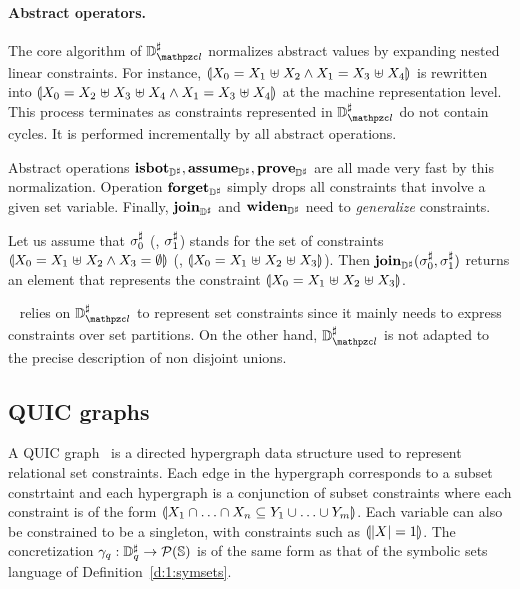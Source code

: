 \paragraph{Abstract operators.}
The core algorithm of \( \adomlin \) normalizes abstract values by
expanding nested linear constraints.
For instance, \( \llparenthesis X_0 = X_1 \mathrel{\uplus} X_2 \wedge
  X_1 = X_3 \mathrel{\uplus} X_4 \rrparenthesis \) is rewritten into
\( \llparenthesis X_0 = X_2 \mathrel{\uplus} X_3 \mathrel{\uplus} X_4 \wedge
  X_1 = X_3 \mathrel{\uplus} X_4 \rrparenthesis \) at the machine representation
level.
This process terminates as constraints represented in \( \adomlin \)
do not contain cycles.
It is performed incrementally by all abstract operations.

Abstract operations \( \textbf{isbot}_{{\mathbb{D}}^{\sharp}}, \textbf{assume}_{{\mathbb{D}}^{\sharp}}, \textbf{prove}_{{\mathbb{D}}^{\sharp}} \) are all
made very fast by this normalization.
Operation \( \textbf{forget}_{{\mathbb{D}}^{\sharp}} \) simply drops all constraints that involve
a given set variable.
Finally, \( \textbf{join}_{{\mathbb{D}}^{\sharp}} \) and \( \textbf{widen}_{{\mathbb{D}}^{\sharp}} \) need to {\em generalize}
constraints.
\begin{example}
  Let us assume that \( {\sigma}^{\sharp}_0 \) (\resp, \( {\sigma}^{\sharp}_1 \)) stands for
  the set of constraints \( \llparenthesis X_0 = X_1 \mathrel{\uplus} X_2
    \wedge X_3 = \emptyset \rrparenthesis \) (\resp, \( \llparenthesis X_0 = X_1
    \mathrel{\uplus} X_2 \mathrel{\uplus} X_3 \rrparenthesis \)).
  Then \( \textbf{join}_{{\mathbb{D}}^{\sharp}}( {\sigma}^{\sharp}_0, {\sigma}^{\sharp}_1 ) \) returns an element that
  represents the constraint \( \llparenthesis X_0 = X_1 \mathrel{\uplus} X_2
    \mathrel{\uplus} X_3 \rrparenthesis \).
\end{example}
\memcad~\cite{memcad:15:sas} relies on \( \adomlin \) to represent set
constraints since it mainly needs to express constraints over set
partitions.
On the other hand, \( \adomlin \) is not adapted to the precise
description of non disjoint unions.

\subsection{QUIC graphs}
\label{s:4:2:quic}

A QUIC graph~\cite{ab:ecoop:13} is a directed hypergraph data structure used to represent relational set constraints.  Each edge in the hypergraph corresponds to a subset constrtaint and each hypergraph is a conjunction of subset constraints where each constraint is of the form $\llparenthesis X_1 \cap \ldots \cap X_n \subseteq Y_1 \cup \ldots \cup Y_m \rrparenthesis$.  Each variable can also be constrained to be a singleton, with constraints such as $\llparenthesis |X| = 1 \rrparenthesis$.  The concretization $\gamma_q : {\mathbb{D}}^{\sharp}_q \rightarrow \mathcal{P}(\mathbb{S})$ is of the same form as that of the symbolic sets language of Definition~\ref{d:1:symsets}.

